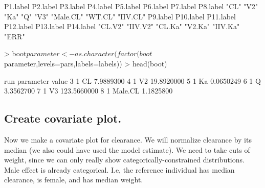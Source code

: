 \begin{Schunk}
\begin{Soutput}
 P1.label  P2.label  P3.label  P4.label  P5.label  P6.label  P7.label  P8.label 
     "CL"      "V2"      "Ka"       "Q"      "V3" "Male.CL"   "WT.CL"  "IIV.CL" 
 P9.label P10.label P11.label P12.label P13.label P14.label 
  "CL.V2"  "IIV.V2"   "CL.Ka"   "V2.Ka"  "IIV.Ka"     "ERR" 
\end{Soutput}
\begin{Sinput}
> boot$parameter <- as.character(factor(boot$parameter,levels=pars,labels=labels))
> head(boot)
\end{Sinput}
\begin{Soutput}
  run parameter       value
3   1        CL   7.9889300
4   1        V2  19.8920000
5   1        Ka   0.0650249
6   1         Q   3.3562700
7   1        V3 123.5660000
8   1   Male.CL   1.1825800
\end{Soutput}
\end{Schunk}
\subsection{Create covariate plot.}
Now we make a covariate plot for clearance.  We will normalize clearance 
by its median (we also could have used the model estimate).  We need to take 
cuts of weight, since we can only really show categorically-constrained distributions.
Male effect is already categorical.  I.e, the reference individual has median
clearance, is female, and has median weight.
